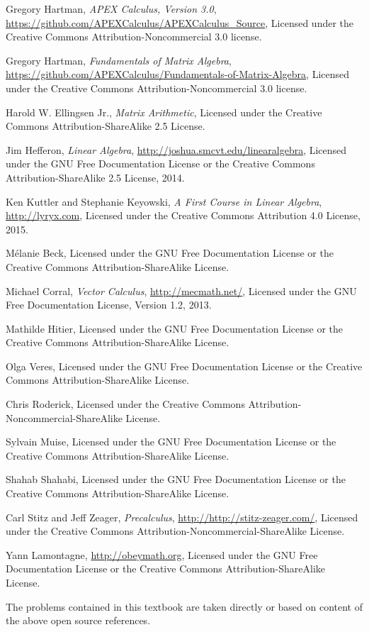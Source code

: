 \onecolumn


\begin{thebibliography}{9}
\label{label:authors}
Gregory Hartman,
\emph{APEX Calculus, Version 3.0},
\url{https://github.com/APEXCalculus/APEXCalculus_Source},
Licensed under the
Creative Commons Attribution-Noncommercial 3.0 license.

Gregory Hartman,
\emph{Fundamentals of Matrix Algebra},
\url{https://github.com/APEXCalculus/Fundamentals-of-Matrix-Algebra},
Licensed under the 
Creative Commons Attribution-Noncommercial 3.0 license.

Harold W. Ellingsen Jr.,
\emph{Matrix Arithmetic},
Licensed under the
Creative Commons Attribution-ShareAlike 2.5 License.
 

Jim Hefferon,
\emph{Linear Algebra},
\url{http://joshua.smcvt.edu/linearalgebra},
Licensed under the GNU Free Documentation License or the 
Creative Commons Attribution-ShareAlike 2.5 License,
2014.

Ken Kuttler and Stephanie Keyowski,
\emph{A First Course in Linear Algebra},
\url{http://lyryx.com},
Licensed under the
Creative Commons Attribution 4.0 License,
2015.

M\'elanie Beck,
Licensed under the GNU Free Documentation License or the
Creative Commons Attribution-ShareAlike License.


Michael Corral,
\emph{Vector Calculus},
\url{http://mecmath.net/},
Licensed under the GNU Free Documentation License, Version 1.2, 2013.

Mathilde Hitier,
Licensed under the GNU Free Documentation License or the
Creative Commons Attribution-ShareAlike License.

Olga Veres,
Licensed under the GNU Free Documentation License or the
Creative Commons Attribution-ShareAlike License.

Chris Roderick,
Licensed under the
Creative Commons Attribution-Noncommercial-ShareAlike License.

Sylvain Muise,
Licensed under the GNU Free Documentation License or the
Creative Commons Attribution-ShareAlike License.

Shahab Shahabi,
Licensed under the GNU Free Documentation License or the
Creative Commons Attribution-ShareAlike License.

Carl Stitz and Jeff Zeager,
\emph{Precalculus},
\url{http://http://stitz-zeager.com/},
Licensed under the
Creative Commons Attribution-Noncommercial-ShareAlike License.

Yann Lamontagne,
\url{http://obeymath.org},
Licensed under the GNU Free Documentation License or the 
Creative Commons Attribution-ShareAlike License.

\end{thebibliography}
The problems contained in this textbook are taken directly or based on content of the above open source references.


